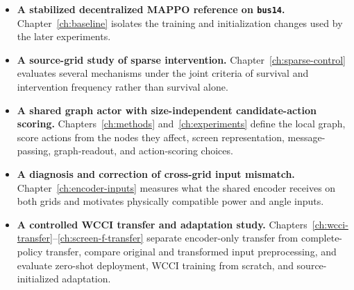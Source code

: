 \begin{itemize}
  \item \textbf{A stabilized decentralized MAPPO reference on
  \texttt{bus14}.} Chapter~\ref{ch:baseline} isolates the training and
  initialization changes used by the later experiments.

  \item \textbf{A source-grid study of sparse intervention.}
  Chapter~\ref{ch:sparse-control} evaluates several mechanisms under the joint
  criteria of survival and intervention frequency rather than survival alone.

  \item \textbf{A shared graph actor with size-independent candidate-action
  scoring.} Chapters~\ref{ch:methods} and~\ref{ch:experiments} define the local
  graph, score actions from the nodes they affect, screen representation,
  message-passing, graph-readout, and action-scoring choices.

  \item \textbf{A diagnosis and correction of cross-grid input mismatch.}
  Chapter~\ref{ch:encoder-inputs} measures what the shared encoder receives on
  both grids and motivates physically compatible power and angle inputs.

  \item \textbf{A controlled WCCI transfer and adaptation study.}
  {\color{red}Chapters~\ref{ch:wcci-transfer}--\ref{ch:screen-f-transfer}
  separate encoder-only transfer from complete-policy transfer, compare
  original and transformed input preprocessing, and evaluate zero-shot
  deployment, WCCI training from scratch, and source-initialized adaptation.}
\end{itemize}
